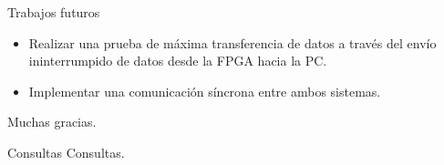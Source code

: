 \begin{frame}{Trabajos futuros}
	\begin{itemize}
		\item Realizar una prueba de máxima transferencia de datos a través del envío ininterrumpido de datos desde la FPGA hacia la PC.
		\item Implementar una comunicación síncrona entre ambos sistemas.
	\end{itemize}
\end{frame}

\begin{frame}{}
	\centering
	\alert {Muchas gracias.}
\end{frame}

\begin{frame}{Consultas}
	\centering
	Consultas.
\end{frame}
